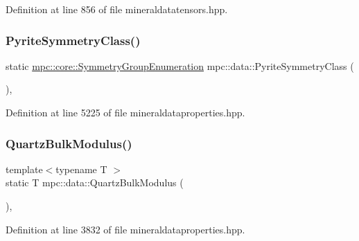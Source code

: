 Definition at line 856 of file mineraldatatensors.\+hpp.

\mbox{\label{namespacempc_1_1data_a3bb7d5d250c8c79d1dfbcc8bf760da9b}} 
\subsubsection{\texorpdfstring{Pyrite\+Symmetry\+Class()}{PyriteSymmetryClass()}}
{\footnotesize\ttfamily static \mbox{\hyperlink{namespacempc_1_1core_a9d979684062547055a0ef5c13077bad8}{mpc\+::core\+::\+Symmetry\+Group\+Enumeration}} mpc\+::data\+::\+Pyrite\+Symmetry\+Class (\begin{DoxyParamCaption}{ }\end{DoxyParamCaption})\hspace{0.3cm}{\ttfamily [inline]}, {\ttfamily [static]}}



Definition at line 5225 of file mineraldataproperties.\+hpp.

\mbox{\label{namespacempc_1_1data_adda154a5fa01966c295515c9adb35fdd}} 
\subsubsection{\texorpdfstring{Quartz\+Bulk\+Modulus()}{QuartzBulkModulus()}}
{\footnotesize\ttfamily template$<$typename T $>$ \\
static T mpc\+::data\+::\+Quartz\+Bulk\+Modulus (\begin{DoxyParamCaption}{ }\end{DoxyParamCaption})\hspace{0.3cm}{\ttfamily [inline]}, {\ttfamily [static]}}



Definition at line 3832 of file mineraldataproperties.\+hpp.

\mbox{\label{namespacempc_1_1data_a0adc6e4d374d5a016d5290538f19cbc4}} 

